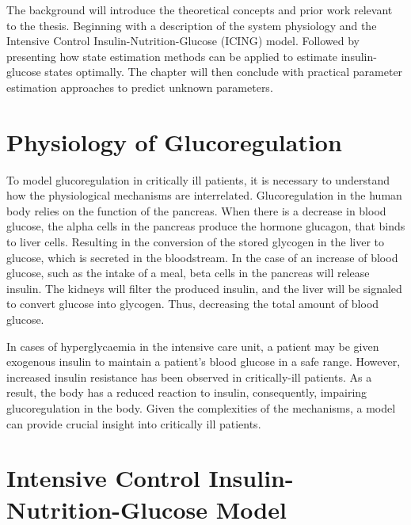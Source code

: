 \documentclass[nomenclature, english, bibtex]{kththesis}
\begin{document}
The background will introduce the theoretical concepts and prior work relevant to the thesis. Beginning with a description of the system physiology and the Intensive Control Insulin-Nutrition-Glucose (\gls{ICING}) model. Followed by presenting how state estimation methods can be applied to estimate insulin-glucose states optimally. The chapter will then conclude with practical parameter estimation approaches to predict unknown parameters.

\section{Physiology of Glucoregulation}

To model glucoregulation in critically ill patients, it is necessary to understand how the physiological mechanisms are interrelated. Glucoregulation in the human body relies on the function of the pancreas. When there is a decrease in blood glucose, the alpha cells in the pancreas produce the hormone glucagon, that binds to liver cells. Resulting in the conversion of the stored glycogen in the liver to glucose, which is secreted in the bloodstream. In the case of an increase of blood glucose, such as the intake of a meal, beta cells in the pancreas will release insulin. The kidneys will filter the produced insulin, and the liver will be signaled to convert glucose into glycogen. Thus, decreasing the total amount of blood glucose.

In cases of hyperglycaemia in the intensive care unit, a patient may be given exogenous insulin to maintain a patient's blood glucose in a safe range.
However, increased insulin resistance has been observed in critically-ill patients. As a result, the body has a reduced reaction to insulin, consequently, impairing glucoregulation in the body. Given the complexities of the mechanisms, a model can provide crucial insight into critically ill patients.

\section{Intensive Control Insulin-Nutrition-Glucose Model}
\end{document}
